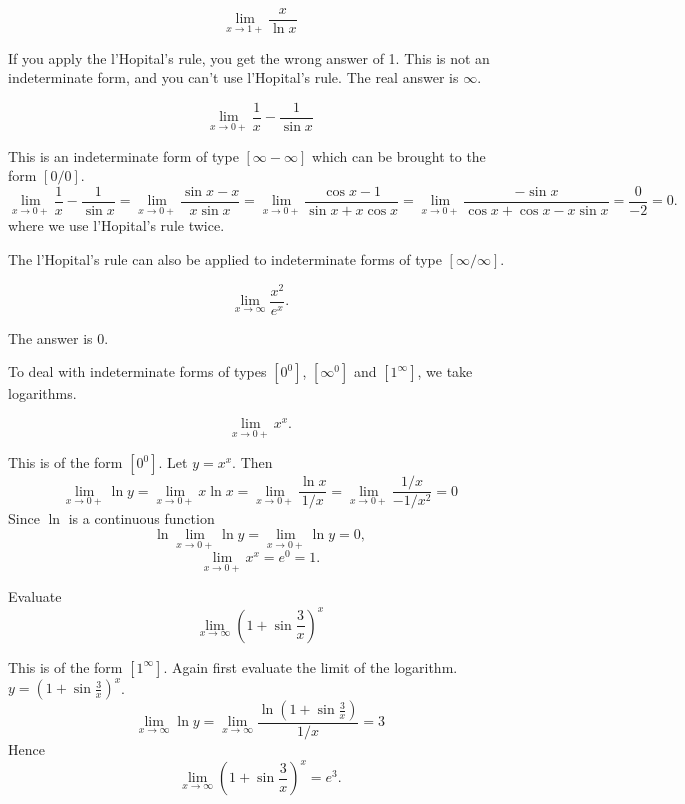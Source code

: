 \documentclass[../main.tex]{subfiles}
\begin{document}
\begin{example}
  \[
    \lim_{x \to 1+} \frac{x}{\ln x}
  \]
\end{example}
\begin{solution}
  If you apply the l'Hopital's rule, you get the wrong answer of 1. This is not an indeterminate form, and you can't use l'Hopital's rule. The real answer is $\infty$.
\end{solution}

\begin{example}
  \[
    \lim_{x \to 0+} \frac{1}{x} - \frac{1}{\sin x}
  \]
\end{example}
\begin{solution}
  This is an indeterminate form of type $[ \infty - \infty]$ which can be brought to the form $[0/0]$.
  \[
    \lim_{x \to 0+} \frac{1}{x} - \frac{1}{\sin x} =
    \lim_{x \to 0+} \frac{\sin x - x}{x \sin x} =
    \lim_{x \to 0+} \frac{\cos x - 1}{\sin x + x \cos x} =
    \lim_{x \to 0+} \frac{-\sin x}{\cos x + \cos x - x \sin x} = \frac{0}{-2} =0.
  \]
  where we use l'Hopital's rule twice.
\end{solution}

The l'Hopital's rule can also be applied to indeterminate forms of type $[\infty/\infty]$.

\begin{example}
  \[
    \lim_{x \to \infty} \frac{x^2}{e^x}.
  \]
\end{example}
\begin{solution}
  The answer is 0.
\end{solution}

To deal with indeterminate forms of types $[0^0]$, $[\infty^0]$ and $[1^{\infty}]$, we take logarithms.

\begin{example}
  \[
    \lim_{x \to 0+} x^x.
  \]
\end{example}
\begin{solution}
  This is of the form $[0^0]$. Let $y= x^x$. Then
  \[
    \lim_{x \to 0+} \ln y = \lim_{x \to 0+} x \ln x = \lim_{x \to 0+} \frac{\ln x}{1/x}
    = \lim_{x \to 0+} \frac{1/x}{-1/x^2} = 0
  \]
  Since $\ln$ is a continuous function
  \[
    \ln \lim_{x \to 0+} \ln y = \lim_{x \to 0+} \ln y = 0,
  \]
  \[
    \lim_{x \to 0+} x^x = e^0 = 1.
  \]
\end{solution}

\begin{example}
  Evaluate
  \[
    \lim_{x \to \infty} \left( 1+ \sin \frac{3}{x} \right)^x
  \]
\end{example}
\begin{example}
  This is of the form $[1^{\infty}]$. Again first evaluate the limit of the logarithm. $y=\left( 1+ \sin \frac{3}{x} \right)^x$.
  \[
    \lim_{x \to \infty} \ln y =
    \lim_{x \to \infty} \frac{\ln \left( 1+ \sin \frac{3}{x} \right)}{1/x} = 3
  \]
  Hence
  \[
    \lim_{x \to \infty} \left( 1+ \sin \frac{3}{x} \right)^x = e^3.
  \]
\end{example}
\end{document}
